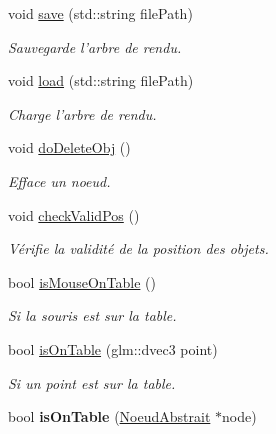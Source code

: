 \begin{DoxyCompactItemize}
void \hyperlink{group__inf2990_ga32032b986fdb830fb158dbd354aa55e7}{save} (std\-::string file\-Path)
\begin{DoxyCompactList}\small\item\em Sauvegarde l'arbre de rendu. \end{DoxyCompactList}\item 
void \hyperlink{group__inf2990_ga4a34752db2d5c26cf97baca584c27dec}{load} (std\-::string file\-Path)
\begin{DoxyCompactList}\small\item\em Charge l'arbre de rendu. \end{DoxyCompactList}\item 
void \hyperlink{group__inf2990_gaa41bbec7d5381099ca3b945b6ed2675f}{do\-Delete\-Obj} ()
\begin{DoxyCompactList}\small\item\em Efface un noeud. \end{DoxyCompactList}\item 
void \hyperlink{group__inf2990_ga612cbe4c05f2e8adfb632db4fb1a3cf0}{check\-Valid\-Pos} ()
\begin{DoxyCompactList}\small\item\em Vérifie la validité de la position des objets. \end{DoxyCompactList}\item 
bool \hyperlink{group__inf2990_gaaaa7ff115548c42faa0570a3c7c4648e}{is\-Mouse\-On\-Table} ()
\begin{DoxyCompactList}\small\item\em Si la souris est sur la table. \end{DoxyCompactList}\item 
\hypertarget{group__inf2990_ga58f9c6d2f80118bcdf95e1967a455bea}{bool \hyperlink{group__inf2990_ga58f9c6d2f80118bcdf95e1967a455bea}{is\-On\-Table} (glm\-::dvec3 point)}\label{group__inf2990_ga58f9c6d2f80118bcdf95e1967a455bea}

\begin{DoxyCompactList}\small\item\em Si un point est sur la table. \end{DoxyCompactList}\item 
\hypertarget{group__inf2990_ga842a9426f91665baed35ec654cec6a20}{bool {\bfseries is\-On\-Table} (\hyperlink{class_noeud_abstrait}{Noeud\-Abstrait} $\ast$node)}\label{group__inf2990_ga842a9426f91665baed35ec654cec6a20}


\end{DoxyCompactItemize}
